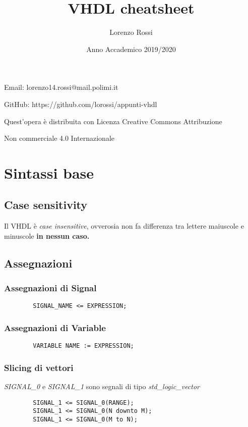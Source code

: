 \documentclass{article}
\title{\Huge VHDL cheatsheet}
\author{\LARGE Lorenzo Rossi}
\date{\LARGE Anno Accademico 2019/2020}
\begin{document}
\maketitle

\vspace{15em}

\large
\begin{doublespacing}
\centerline{Email: lorenzo14.rossi@mail.polimi.it}
\centerline{GitHub: https://github.com/lorossi/appunti-vhdl}

\vspace{16em}
\centerline{Quest'opera è distribuita con Licenza Creative Commons Attribuzione}
\centerline{Non commerciale 4.0 Internazionale \ccbynceu}
\end{doublespacing}

\newpage
{}

\tableofcontents

\newpage 

\clearpage
{}

\section{Sintassi base}
\subsection{Case sensitivity}
Il VHDL è \textit{case insensitive}, ovverosia non fa differenza tra lettere maiuscole e minuscole \textbf{in nessun caso.}
\subsection{Assegnazioni}
\subsubsection{Assegnazioni di Signal}
\begin{verbatim}
	    SIGNAL_NAME <= EXPRESSION;
\end{verbatim}
\subsubsection{Assegnazioni di Variable}
\begin{verbatim}
	    VARIABLE NAME := EXPRESSION;
\end{verbatim}
\subsubsection{Slicing di vettori}
\textit{SIGNAL\_0} e \textit{SIGNAL\_1} sono segnali di tipo \textit{std\_logic\_vector}
\begin{verbatim}
	    SIGNAL_1 <= SIGNAL_0(RANGE);
	    SIGNAL_1 <= SIGNAL_0(N downto M);
	    SIGNAL_1 <= SIGNAL_0(M to N);
\end{verbatim}
\end{document}
